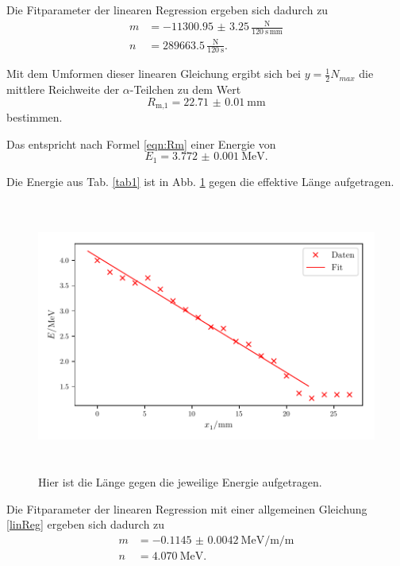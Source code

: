 \noindent Die Fitparameter der linearen Regression ergeben sich dadurch zu 
\begin{align*}
    m &= - \num{11300.95(325)} \,\frac{\text{N}}{\SI{120}{\second}\, \si{\milli\meter}} \\
    n &= \num{289663.5} \, \frac{\text{N}}{\SI{120}{\second}} .
\end{align*}


\noindent Mit dem Umformen dieser linearen Gleichung ergibt sich bei $y = \frac{1}{2} N_{max}$ die mittlere Reichweite der $\alpha$-Teilchen zu dem Wert %
\begin{equation*}
    R_\text{m,1} = \SI{22.71(1)}{\milli\meter}
\end{equation*}
bestimmen.

\noindent Das entspricht nach Formel \eqref{eqn:Rm} einer Energie von %
\begin{equation*}
    E_1 = \SI{3.772(1)}{\mega\electronvolt}.
\end{equation*}

\noindent Die Energie aus Tab. \ref{tab1} ist in Abb. \ref{fig:energie1} gegen die effektive Länge aufgetragen.
\begin{figure}
    \centering
    \includegraphics[width=15cm, height=9cm]{build/plotb.pdf}
    \caption{Hier ist die Länge gegen die jeweilige Energie aufgetragen.}
    \label{fig:energie1}
\end{figure}

\noindent Die Fitparameter der linearen Regression mit einer allgemeinen Gleichung \eqref{linReg} ergeben sich dadurch zu 
\begin{align*}
    m &= - \SI{0.1145(42)}{\mega\electronvolt\per\milli\per\meter} \\
    n &= \SI{4.070}{\mega\electronvolt} .
\end{align*}

